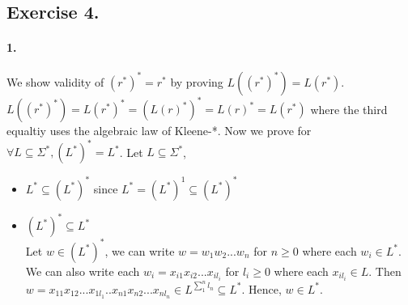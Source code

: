 \documentclass[12pt]{article}
\begin{document}
\subsection*{Exercise 4.}
\paragraph*{1.} We show validity of \((r^*)^* = r^*\) by proving \(L((r^*)^*) = L(r^*)\).\\
\(L((r^*)^*) = L(r^*)^* = (L(r)^*)^* = L(r)^* = L(r^*)\) where the third equaltiy uses the algebraic law of Kleene-*. Now we prove for \(\forall L \subseteq \Sigma^*, (L^*)^* = L^*\). Let \(L \subseteq \Sigma^*\),
\begin{itemize}
  \item \(L^* \subseteq (L^*)^*\) since \(L^* = (L^*)^1 \subseteq (L^*)^*\)
  \item \((L^*)^* \subseteq L^*\)\\
  Let \(w \in (L^*)^*\), we can write \(w = w_1w_2...w_n\) for \(n \geq 0\) where each \(w_i \in L^*\). We can also write each \(w_i = x_{i1}x_{i2}...x_{il_i}\) for \(l_i \geq 0\) where each \(x_{il_i} \in L\). Then \(w = x_{11}x_{12}...x_{1l_1}..x_{n1}x_{n2}...x_{nl_n} \in L^{\sum_1^n{l_n}} \subseteq L^*\). Hence, \(w \in L^*\). 
\end{itemize}
\end{document}
